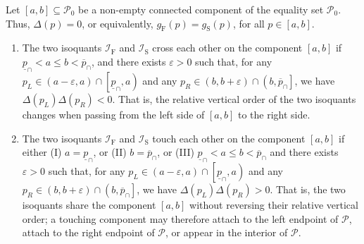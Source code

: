 \documentclass[a4paper,12pt]{article}
\begin{document}
\begin{definition}\label{def:crossing_touching}
Let $\left[a,b\right]\subseteq\mathcal{P}_0$ be a non-empty connected component of the equality set $\mathcal{P}_0$. Thus, $\Delta\left(p\right)=0$, or equivalently, $g_{\text{F}}\left(p\right)=g_{\text{S}}\left(p\right)$, for all $p\in\left[a,b\right]$.
\begin{enumerate}
\item[(i)] The two isoquants $\mathcal{I}_{\text{F}}$ and $\mathcal{I}_{\text{S}}$ cross each other on the component $\left[a,b\right]$ if $\underline{p}_{\cap}<a\leq b<\overline{p}_{\cap}$, and there exists $\varepsilon>0$ such that, for any $p_L\in\left(a-\varepsilon,a\right)\cap\left[\underline{p}_{\cap},a\right)$ and any $p_R\in\left(b,b+\varepsilon\right)\cap\left(b,\overline{p}_{\cap}\right]$, we have $\Delta\left(p_L\right)\Delta\left(p_R\right)<0$. That is, the relative vertical order of the two isoquants changes when passing from the left side of $\left[a,b\right]$ to the right side.
\item[(ii)] The two isoquants $\mathcal{I}_{\text{F}}$ and  $\mathcal{I}_{\text{S}}$ touch each other on the component $\left[a,b\right]$ if either (I) $a=\underline{p}_{\cap}$, or (II) $b=\overline{p}_{\cap}$, or (III) $\underline{p}_{\cap}<a\leq b<\overline{p}_{\cap}$ and there exists $\varepsilon>0$ such that, for any $p_L\in\left(a-\varepsilon,a\right)\cap\left[\underline{p}_{\cap},a\right)$ and any $p_R\in\left(b,b+\varepsilon\right)\cap\left(b,\overline{p}_{\cap}\right]$, we have $\Delta\left(p_L\right)\Delta\left(p_R\right)>0$. That is, the two isoquants share the component $\left[a,b\right]$ without reversing their relative vertical order; a touching component may therefore attach to the left endpoint of $\mathcal{P}$, attach to the right endpoint of $\mathcal{P}$, or appear in the interior of $\mathcal{P}$.
\end{enumerate}
\end{definition}
\end{document}
